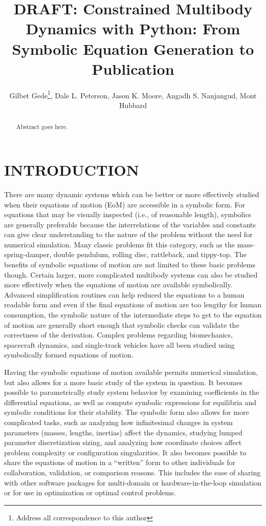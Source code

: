\documentclass[twocolumn,10pt]{asme2e}
\title{DRAFT: Constrained Multibody Dynamics with Python: From Symbolic
Equation Generation to Publication}
\author{Gilbet Gede\thanks{Address all correspondence to this author}, Dale L.
Peterson, Jason K. Moore, Angadh S. Nanjangud, Mont Hubbard
  \affiliation{
    Sports Biomechanics Laboratory\\
    Department of Mechanical and Aerospace Engineering\\
    University of California\\
    Davis, California 95616\\
    Email: \{ggede, dlpeterson, jkmoor, asnanjangud, mhubbard\}@ucdavis.edu
  }
}
\begin{document}
\maketitle

\begin{abstract}
Abstract goes here.
\end{abstract}

\section*{INTRODUCTION}
There are many dynamic systems which can be better or more effectively studied
when their equations of motion (EoM) are accessible in a symbolic form. For
equations that may be visually inspected (i.e., of reasonable length),
symbolics are generally preferable because the interrelations of the variables
and constants can give clear understanding to the nature of the problem without
the need for numerical simulation. Many classic problems fit this category,
such as the mass-spring-damper, double pendulum, rolling disc, rattleback, and
tippy-top. The benefits of symbolic equations of motion are not limited to
these basic problems though. Certain larger, more complicated multibody systems
can also be studied more effectively when the equations of motion are available
symbolically. Advanced simplification routines can help reduced the equations
to a human readable form and even if the final equations of motion are too
lengthy for human consumption, the symbolic nature of the intermediate steps to
get to the equation of motion are generally short enough that symbolic checks
can validate the correctness of the derivation. Complex problems regarding
biomechanics, spacecraft dynamics, and single-track vehicles have all been
studied using symbolically formed equations of motion.

Having the symbolic equations of motion available permits numerical simulation,
but also allows for a more basic study of the system in question. It becomes
possible to parametrically study system behavior by examining coefficients in
the differential equations, as well as compute symbolic expressions for
equilibria and symbolic conditions for their stability. The symbolic form also
allows for more complicated tasks, such as analyzing how infinitesimal changes
in system parameters (masses, lengths, inertias) affect the dynamics, studying
lumped parameter discretization sizing, and analyzing how coordinate choices
affect problem complexity or configuration singularities. It also becomes
possible to share the equations of motion in a ``written'' form to other
individuals for collaboration, validation, or comparison reasons. This includes
the ease of sharing with other software packages for multi-domain or
hardware-in-the-loop simulation or for use in optimization or optimal control
problems.
\end{document}
